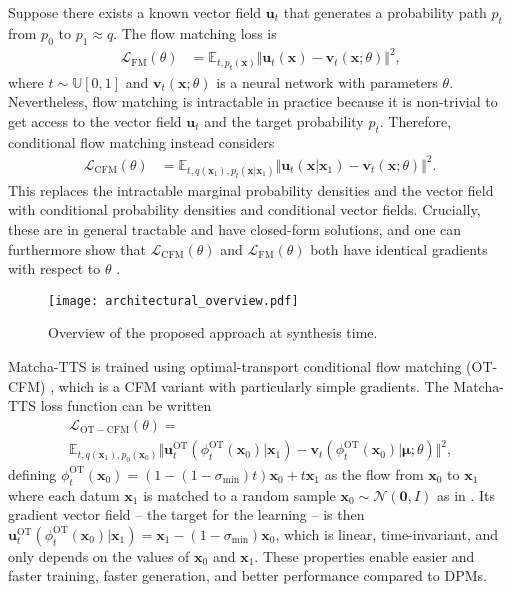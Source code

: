 \documentclass[british]{article}
\newcommand{\x}{\boldsymbol{x}}
\begin{document}
Suppose there exists a known vector field $\boldsymbol{u}_t$ that generates a probability path $p_t$ from $p_0$ to $p_1\approx q$.
The flow matching loss is
\begin{align}
\mathcal{L}_{\mathrm{FM}}(\theta)
& = \mathbb{E}_{t, p_t(\x)}\Vert \boldsymbol{u}_t(\x) - \boldsymbol{v}_t(\x; \theta) \Vert^2
\text{,}
\end{align}
where $t\sim\mathbb{U}[0,1]$ and $\boldsymbol{v}_t(\x; \theta)$ is a neural network with parameters $\theta$.
Nevertheless, flow matching is intractable in practice because it is non-trivial to get access to the vector field $\boldsymbol{u}_t$ and the target probability $p_t$.
Therefore, conditional flow matching instead considers
\begin{align}
\mathcal{L}_{\mathrm{CFM}} (\theta)
& = \mathbb{E}_{t, q(\x_1),p_t(\x|\x_1)}\Vert \boldsymbol{u}_t(\x\vert \x_1) - \boldsymbol{v}_t(\x; \theta) \Vert^2
\text{.}
\end{align}
This replaces the intractable marginal probability densities and the vector field with conditional probability densities and conditional vector fields. Crucially, these are in general tractable and have closed-form solutions, and one can furthermore show that $\mathcal{L}_{\mathrm{CFM}}(\theta)$ and $\mathcal{L}_{\mathrm{FM}}(\theta)$ both have identical gradients with respect to $\theta$ \cite{lipman2023flow}.
\begin{figure}[!t]
\centering
\texttt{[image: architectural\_overview.pdf]}
\caption{Overview of the proposed approach at synthesis time.}
\label{fig: model architecture overview}
\vspace{-\baselineskip}
\end{figure}

Matcha-TTS is trained using optimal-transport conditional flow matching (OT-CFM) \cite{lipman2023flow}, which is a CFM variant with particularly simple gradients.
The Matcha-TTS loss function can be written
\begin{multline}
\mathcal{L}_{\mathrm{OT-CFM}} (\theta) =\\
\mathbb{E}_{t, q(\x_1),p_0(\x_0)}
\Vert\boldsymbol{u}^{\mathrm{OT}}_t(\phi^{\mathrm{OT}}_t(\x_0)| \x_1)- \boldsymbol{v}_t(\phi^{\mathrm{OT}}_t(\x_0) | \boldsymbol{\mu}; \theta) \Vert^2
\text{,}
\end{multline}
defining $\phi^{\mathrm{OT}}_t(\x_0) = (1- (1-\sigma_{\mathrm{min}})t)\x_0 + t \x_1$ as the flow from $\x_0$ to $\x_1$ where each datum $\x_1$ is matched to a random sample $\x_0\sim\mathcal{N}(\boldsymbol{0},I)$ as in \cite{lipman2023flow}.
Its gradient vector field -- the target for the learning -- is then $\boldsymbol{u}^{\mathrm{OT}}_t(\phi^{\mathrm{OT}}_t(\x_0)\vert \x_1) = \x_1-(1-\sigma_{\mathrm{min}})\x_0$, which is linear, time-invariant, and only depends on the values of $\x_0$ and $\x_1$.
These properties enable easier and faster training, faster generation, and better performance compared to DPMs.
\end{document}
